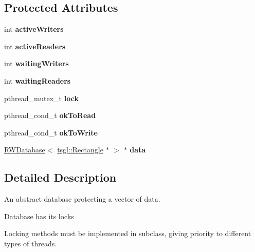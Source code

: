 \subsection*{Protected Attributes}
\begin{DoxyCompactItemize}
\item 
\mbox{\label{class_lock_ad69e84777545706182e74a890303fe86}} 
int {\bfseries active\+Writers}
\item 
\mbox{\label{class_lock_ab826b5e8650fb5028756b1b189470446}} 
int {\bfseries active\+Readers}
\item 
\mbox{\label{class_lock_aebab758da5c666817aa2a3cae2b7e7cc}} 
int {\bfseries waiting\+Writers}
\item 
\mbox{\label{class_lock_a6a79d1a4a2ca7c9a5db7150c2775b4b3}} 
int {\bfseries waiting\+Readers}
\item 
\mbox{\label{class_lock_a71ad42fa0f867c563c36d0e6fd265d66}} 
pthread\+\_\+mutex\+\_\+t {\bfseries lock}
\item 
\mbox{\label{class_lock_ad3f154d852d212a46697c9f1d4ec9c16}} 
pthread\+\_\+cond\+\_\+t {\bfseries ok\+To\+Read}
\item 
\mbox{\label{class_lock_a236095b855dabe05d173ee913bd9d876}} 
pthread\+\_\+cond\+\_\+t {\bfseries ok\+To\+Write}
\item 
\mbox{\label{class_lock_ac05707ecf7e23343a78add6be3212861}} 
\hyperlink{class_r_w_database}{R\+W\+Database}$<$ \hyperlink{classtsgl_1_1_rectangle}{tsgl\+::\+Rectangle} $\ast$ $>$ $\ast$ {\bfseries data}
\end{DoxyCompactItemize}


\subsection{Detailed Description}
An abstract database protecting a vector of data. 

Database has its locks

Locking methods must be implemented in subclass, giving priority to different types of threads. 

